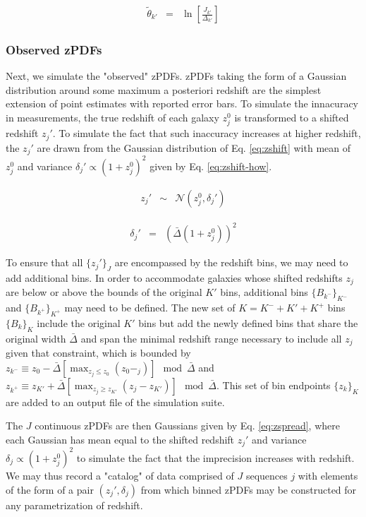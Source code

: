 \documentclass[preprint]{aastex}
\begin{document}
\begin{eqnarray}
\label{eq:sums}
\tilde{\theta}_{k'} &=& \ln\left[\frac{J_{k'}}{\Delta_{k'}}\right]
\end{eqnarray}

\clearpage
\subsubsection{Observed zPDFs}
\label{sec:d}

Next, we simulate the "observed" zPDFs.  zPDFs taking the form of a Gaussian distribution around some maximum a posteriori redshift are the simplest extension of point estimates with reported error bars.  To simulate the innacuracy in measurements, the true redshift of each galaxy $z_{j}^{0}$ is transformed to a shifted redshift $z_{j}'$.  To simulate the fact that such inaccuracy increases at higher redshift, the $z_{j}'$ are drawn from the Gaussian distribution of Eq. \ref{eq:zshift} with mean of $z_{j}^{0}$ and variance $\delta_{j}'\propto(1+z_{j}^{0})^{2}$ given by Eq. \ref{eq:zshift-how}.  

\begin{eqnarray}
\label{eq:zshift}
z_{j}' &\sim& \mathcal{N}(z_{j}^{0},\delta_{j}')
\end{eqnarray}

\begin{eqnarray}
\label{eq:zshift-how}
\delta_{j}' &=& (\bar{\Delta}(1+z^{0}_{j}))^{2}
\end{eqnarray}

To ensure that all $\{z_{j}'\}_{J}$ are encompassed by the redshift bins, we may need to add additional bins.  In order to accommodate galaxies whose shifted redshifts $z_{j}$ are below or above the bounds of the original $K'$ bins, additional bins $\{B_{k^{-}}\}_{K^{-}}$ and $\{B_{k^{+}}\}_{K^{+}}$ may need to be defined.  The new set of $K=K^{-}+K'+K^{+}$ bins $\{B_{k}\}_{K}$ include the original $K'$ bins but add the newly defined bins that share the original width $\bar{\Delta}$ and span the minimal redshift range necessary to include all $z_{j}$ given that constraint, which is bounded by $z_{k^{-}}\equiv z_{0}-\bar{\Delta}[\max_{z_{j}\leq z_{0}}(z_{0}-_{j})]\mod\bar{\Delta}$ and $z_{k^{+}}\equiv z_{K'}+\bar{\Delta}[\max_{z_{j}\geq z_{K'}}(z_{j}-z_{K'})]\mod\bar{\Delta}$.  This set of bin endpoints $\{z_{k}\}_{K}$ are added to an output file of the simulation suite.

The $J$ continuous zPDFs are then Gaussians given by Eq. \ref{eq:zspread}, where each Gaussian has mean equal to the shifted redshift $z_{j}'$ and variance $\delta_{j}\propto(1+z_{j}^{0})^{2}$ to simulate the fact that the imprecision increases with redshift.  We may thus record a "catalog" of data comprised of $J$ sequences $j$ with elements of the form of a pair $(z_{j}',\delta_{j})$ from which binned zPDFs may be constructed for any parametrization of redshift.  
\end{document}
